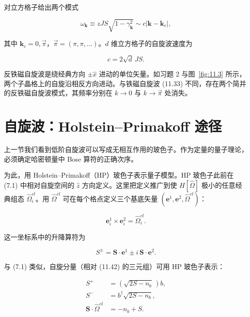 对立方格子给出两个模式

\begin{equation*}
\omega_ {\mathbf {k}} \equiv z J S \sqrt {1 - \gamma_ {\mathbf {k}} ^ {2}} \sim c \left| \mathbf {k} - \mathbf {k} _ {c} \right| ,
\tag{11.40}
\end{equation*}

其中 $\mathbf{k}_c = 0, \vec{\pi}$，$\vec{\pi} = (\pi, \pi, \ldots)$。$d$ 维立方格子的自旋波速度为

\begin{equation*}
c = 2 \sqrt {d} \, J S.
\tag{11.41}
\end{equation*}

反铁磁自旋波是绕经典方向 $\pm\hat{x}$ 进动的单位矢量。如习题 2 与图~\ref{fig:11.3} 所示，两个子晶格上的自旋沿相反方向进动。与铁磁自旋波 (11.33) 不同，存在两个简并的反铁磁自旋波模式，其频率分别在 $k\rightarrow0$ 与 $k\rightarrow\vec{\pi}$ 处消失。

\section{自旋波：Holstein--Primakoff 途径}

上一节我们看到低阶自旋波可以写成无相互作用的玻色子。作为定量的量子理论，必须确定哈密顿量中 Bose 算符的正确次序。

为此，用 Holstein--Primakoff（HP）玻色子表示量子模型。HP 玻色子此前在 (7.1) 中相对自旋空间的 $\hat{z}$ 方向定义。这里把定义推广到使 $H[\hat{\Omega}]$ 极小的任意经典组态 $\hat{\Omega}_{i}^{cl}$。用 $\hat{\Omega}^{cl}$ 可在每个格点定义三个基底矢量 $(\mathbf{e}^{1},\mathbf{e}^{2},\hat{\Omega}^{cl})$：

\begin{equation*}
\mathbf {e} _ {i} ^ {1} \times \mathbf {e} _ {i} ^ {2} = \hat {\Omega} _ {i} ^ {cl}.
\tag{11.42}
\end{equation*}

这一坐标系中的升降算符为

\begin{equation*}
S ^ {\pm} = \mathbf {S} \cdot \mathbf {e} ^ {1} \pm i \, \mathbf {S} \cdot \mathbf {e} ^ {2}.
\tag{11.43}
\end{equation*}

与 (7.1) 类似，自旋分量（相对 (11.42) 的三元组）可用 HP 玻色子表示：

\begin{align*}
S ^ {+} & = \left( \sqrt {2 S - n _ {b}} \, \right) b ,\\
S ^ {-} & = b ^ {\dagger} \sqrt {2 S - n _ {b}} ,\\
\mathbf {S} \cdot \hat {\Omega} ^ {cl} & = - n _ {b} + S .
\tag{11.44}
\end{align*}

